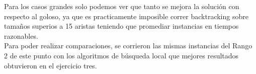 Para los casos grandes solo podemos ver que tanto se mejora la solución con respecto al goloso, ya que es practicamente imposible correr backtracking sobre tamaños superios a 15 aristas teniendo que promediar instancias en tiempos razonables.\\

Para poder realizar comparaciones, se corrieron las mismas instancias del Rango 2 de este punto con los algoritmos de búsqueda local que mejores resultados obtuvieron en el ejercicio tres.\\

\begin{figure}[h] 
 \centering
       \label{fig:randomDist1}
    \label{fig:randomMejora1}
\end{figure}

\begin{figure}[h] 
 \centering
       \label{fig:randomDist1}
    \label{fig:randomMejora1}
\end{figure}

